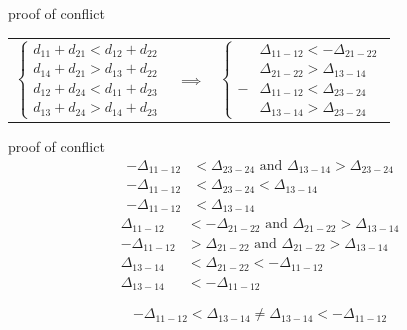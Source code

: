 \documentclass[10pt, compress]{beamer}
\begin{document}
\begin{frame}{proof of conflict}
    \begin{tabular}{c c c}
        $\begin{cases} 
        d_{11} + d_{21} < d_{12} + d_{22}\\
        d_{14} + d_{21} > d_{13} + d_{22}\\
        d_{12} + d_{24} < d_{11} + d_{23}\\
        d_{13} + d_{24} > d_{14} + d_{23}
        \end{cases}$ 
        & $\implies$ &
        $\begin{cases} 
        &\Delta_{11-12} < -\Delta_{21-22}\\
        &\Delta_{21-22} > \Delta_{13-14}\\
        -&\Delta_{11-12} < \Delta_{23-24}\\
        &\Delta_{13-14} > \Delta_{23-24}
        \end{cases}$
    \end{tabular}
\end{frame}

\begin{frame}{proof of conflict}
    \begin{align*}
        -\Delta_{11-12} &< \Delta_{23-24} \text{ and } \Delta_{13-14} > \Delta_{23-24}\\
        -\Delta_{11-12} &< \Delta_{23-24} < \Delta_{13-14}\\
        -\Delta_{11-12} &< \Delta_{13-14}
    \end{align*}
    \begin{align*}
        \Delta_{11-12} &< -\Delta_{21-22} \text{ and } \Delta_{21-22} > \Delta_{13-14}\\
        -\Delta_{11-12} &> \Delta_{21-22} \text{ and } \Delta_{21-22} > \Delta_{13-14}\\
        \Delta_{13-14} &< \Delta_{21-22} < -\Delta_{11-12}\\
        \Delta_{13-14} &< -\Delta_{11-12}
    \end{align*}
    
    \begin{equation} \label{eqation}
        -\Delta_{11-12} < \Delta_{13-14} \neq \Delta_{13-14} < -\Delta_{11-12}
    \end{equation}
\end{frame}


\end{document}
